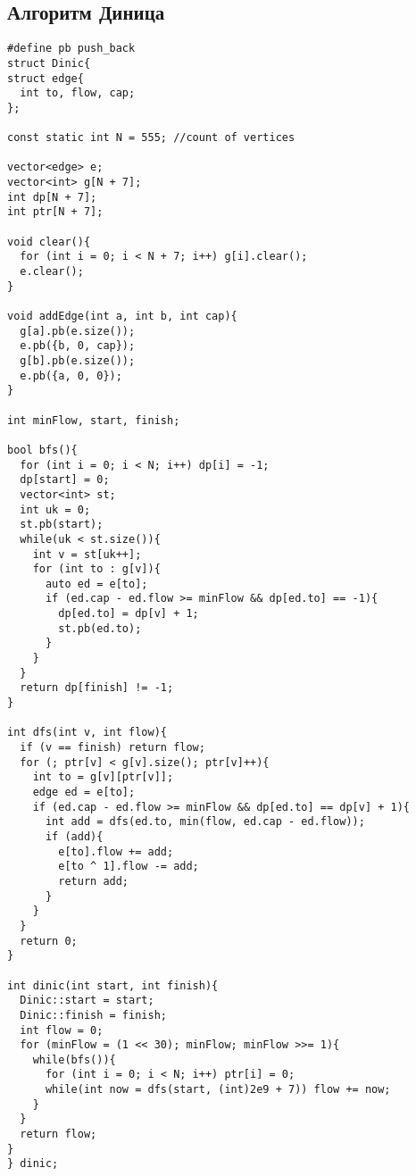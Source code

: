 \subsection{Алгоритм Диница}
\begin{lstlisting}
#define pb push_back
struct Dinic{
struct edge{
  int to, flow, cap;
};

const static int N = 555; //count of vertices

vector<edge> e;
vector<int> g[N + 7];
int dp[N + 7];
int ptr[N + 7];

void clear(){
  for (int i = 0; i < N + 7; i++) g[i].clear();
  e.clear();
}

void addEdge(int a, int b, int cap){
  g[a].pb(e.size());
  e.pb({b, 0, cap});
  g[b].pb(e.size());
  e.pb({a, 0, 0});
}

int minFlow, start, finish;

bool bfs(){
  for (int i = 0; i < N; i++) dp[i] = -1;
  dp[start] = 0;
  vector<int> st;
  int uk = 0;
  st.pb(start);
  while(uk < st.size()){
    int v = st[uk++];
    for (int to : g[v]){
      auto ed = e[to];
      if (ed.cap - ed.flow >= minFlow && dp[ed.to] == -1){
        dp[ed.to] = dp[v] + 1;
        st.pb(ed.to);
      }
    }
  }
  return dp[finish] != -1;
}

int dfs(int v, int flow){
  if (v == finish) return flow;
  for (; ptr[v] < g[v].size(); ptr[v]++){
    int to = g[v][ptr[v]];
    edge ed = e[to];
    if (ed.cap - ed.flow >= minFlow && dp[ed.to] == dp[v] + 1){
      int add = dfs(ed.to, min(flow, ed.cap - ed.flow));
      if (add){
        e[to].flow += add;
        e[to ^ 1].flow -= add;
        return add;
      }
    }
  }
  return 0;
}

int dinic(int start, int finish){
  Dinic::start = start;
  Dinic::finish = finish;
  int flow = 0;
  for (minFlow = (1 << 30); minFlow; minFlow >>= 1){
    while(bfs()){
      for (int i = 0; i < N; i++) ptr[i] = 0;
      while(int now = dfs(start, (int)2e9 + 7)) flow += now;
    }
  }
  return flow;
}
} dinic;
\end{lstlisting}